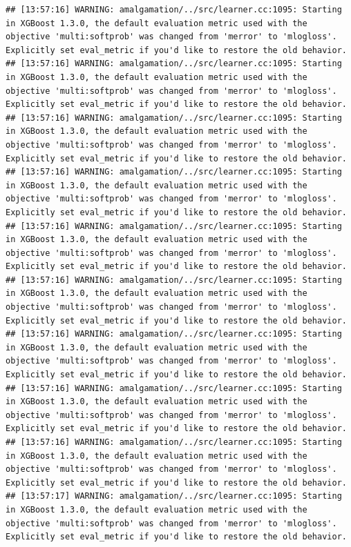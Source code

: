 \documentclass[
]{scrbook}
\begin{document}
\begin{verbatim}
## [13:57:16] WARNING: amalgamation/../src/learner.cc:1095: Starting in XGBoost 1.3.0, the default evaluation metric used with the objective 'multi:softprob' was changed from 'merror' to 'mlogloss'. Explicitly set eval_metric if you'd like to restore the old behavior.
## [13:57:16] WARNING: amalgamation/../src/learner.cc:1095: Starting in XGBoost 1.3.0, the default evaluation metric used with the objective 'multi:softprob' was changed from 'merror' to 'mlogloss'. Explicitly set eval_metric if you'd like to restore the old behavior.
## [13:57:16] WARNING: amalgamation/../src/learner.cc:1095: Starting in XGBoost 1.3.0, the default evaluation metric used with the objective 'multi:softprob' was changed from 'merror' to 'mlogloss'. Explicitly set eval_metric if you'd like to restore the old behavior.
## [13:57:16] WARNING: amalgamation/../src/learner.cc:1095: Starting in XGBoost 1.3.0, the default evaluation metric used with the objective 'multi:softprob' was changed from 'merror' to 'mlogloss'. Explicitly set eval_metric if you'd like to restore the old behavior.
## [13:57:16] WARNING: amalgamation/../src/learner.cc:1095: Starting in XGBoost 1.3.0, the default evaluation metric used with the objective 'multi:softprob' was changed from 'merror' to 'mlogloss'. Explicitly set eval_metric if you'd like to restore the old behavior.
## [13:57:16] WARNING: amalgamation/../src/learner.cc:1095: Starting in XGBoost 1.3.0, the default evaluation metric used with the objective 'multi:softprob' was changed from 'merror' to 'mlogloss'. Explicitly set eval_metric if you'd like to restore the old behavior.
## [13:57:16] WARNING: amalgamation/../src/learner.cc:1095: Starting in XGBoost 1.3.0, the default evaluation metric used with the objective 'multi:softprob' was changed from 'merror' to 'mlogloss'. Explicitly set eval_metric if you'd like to restore the old behavior.
## [13:57:16] WARNING: amalgamation/../src/learner.cc:1095: Starting in XGBoost 1.3.0, the default evaluation metric used with the objective 'multi:softprob' was changed from 'merror' to 'mlogloss'. Explicitly set eval_metric if you'd like to restore the old behavior.
## [13:57:16] WARNING: amalgamation/../src/learner.cc:1095: Starting in XGBoost 1.3.0, the default evaluation metric used with the objective 'multi:softprob' was changed from 'merror' to 'mlogloss'. Explicitly set eval_metric if you'd like to restore the old behavior.
## [13:57:17] WARNING: amalgamation/../src/learner.cc:1095: Starting in XGBoost 1.3.0, the default evaluation metric used with the objective 'multi:softprob' was changed from 'merror' to 'mlogloss'. Explicitly set eval_metric if you'd like to restore the old behavior.

\end{verbatim}
\end{document}

